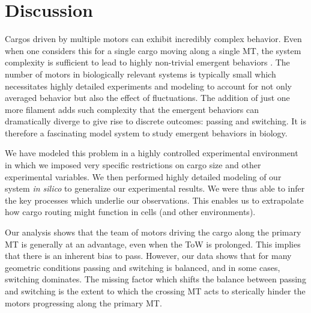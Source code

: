 \section{Discussion}

Cargos driven by multiple motors can exhibit incredibly complex behavior. Even when one considers this for a single cargo moving along a single MT, the system complexity is sufficient to lead to highly non-trivial emergent behaviors \cite{Kunwar2008,Jamison2010}. The number of motors in biologically relevant systems is typically small which necessitates highly detailed experiments and modeling to account for not only averaged behavior but also the effect of fluctuations. The addition of just one more filament adds such complexity that the emergent behaviors can dramatically diverge to give rise to discrete outcomes: passing and switching. It is therefore a fascinating model system to study emergent behaviors in biology.

We have modeled this problem in a highly controlled experimental environment in which we imposed very specific restrictions on cargo size and other experimental variables. We then performed highly detailed modeling of our system \textit{in silico} to generalize our experimental results. We were thus able to infer the key processes which underlie our observations. This enables us to extrapolate how cargo routing might function in cells (and other environments).

Our analysis shows that the team of motors driving the cargo along the primary MT is generally at an advantage, even when the ToW is prolonged. This implies that there is an inherent bias to pass. However, our data shows that for many geometric conditions passing and switching is balanced, and in some cases, switching dominates. The missing factor which shifts the balance between passing and switching is the extent to which the crossing MT acts to sterically hinder the motors progressing along the primary MT.

